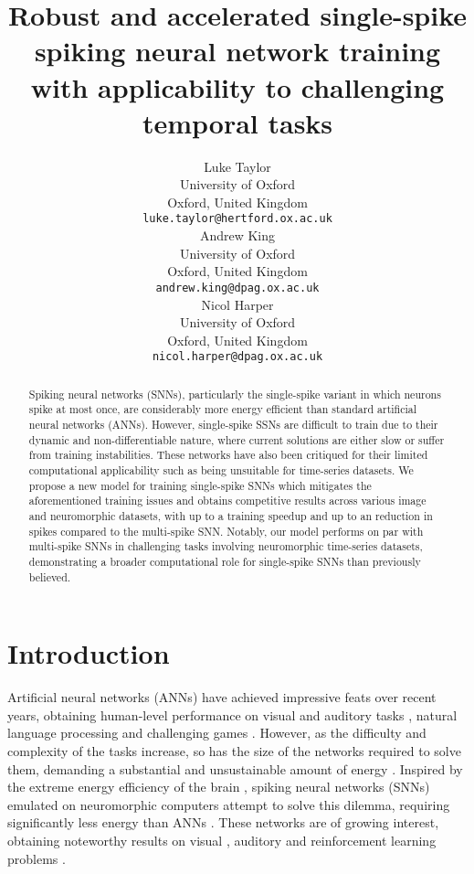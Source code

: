 \documentclass{article} \usepackage{iclr2023_conference,times}
\title{Robust and accelerated single-spike spiking neural network training with applicability to challenging temporal tasks}
\author{Luke Taylor\\
  University of Oxford\\
  Oxford, United Kingdom \\
  \texttt{luke.taylor@hertford.ox.ac.uk} \\
\And
  Andrew King \\
  University of Oxford\\
  Oxford, United Kingdom \\
  \texttt{andrew.king@dpag.ox.ac.uk} \\
  \AND
  Nicol Harper \\
  University of Oxford\\
  Oxford, United Kingdom \\
  \texttt{nicol.harper@dpag.ox.ac.uk} \\
}
\begin{document}
\maketitle

\begin{abstract}
Spiking neural networks (SNNs), particularly the single-spike variant in which neurons spike at most once, are considerably more energy efficient than standard artificial neural networks (ANNs). However, single-spike SSNs are difficult to train due to their dynamic and non-differentiable nature, where current solutions are either slow or suffer from training instabilities. These networks have also been critiqued for their limited computational applicability such as being unsuitable for time-series datasets. We propose a new model for training single-spike SNNs which mitigates the aforementioned training issues and obtains competitive results across various image and neuromorphic datasets, with up to a  training speedup and up to an  reduction in spikes compared to the multi-spike SNN. Notably, our model performs on par with multi-spike SNNs in challenging tasks involving neuromorphic time-series datasets, demonstrating a broader computational role for single-spike SNNs than previously believed.
\end{abstract}

\section{Introduction}
Artificial neural networks (ANNs) have achieved impressive feats over recent years, 
obtaining human-level performance on visual and auditory tasks \citep{hinton2012deep, he2016deep}, natural language processing \citep{brown2020language} and challenging games \citep{mnih2015human, silver2017mastering, vinyals2019grandmaster}. However, as the difficulty and complexity of the tasks increase, so has the size of the networks required to solve them, demanding a substantial and unsustainable amount of energy \citep{strubell2019energy, schwartz2020green}. Inspired by the extreme energy efficiency of the brain \citep{sokoloff1960metabolism}, spiking neural networks (SNNs) emulated on neuromorphic computers attempt to solve this dilemma, requiring significantly less energy than ANNs \citep{wunderlich2019demonstrating}. These networks are of growing interest, obtaining noteworthy results on visual \citep{fang2021deep, zhou2021spiking}, auditory \citep{yin2020effective, yao2021temporal} and reinforcement learning problems \citep{patel2019improved, tang2020deep, bellec2020solution}.
\end{document}
